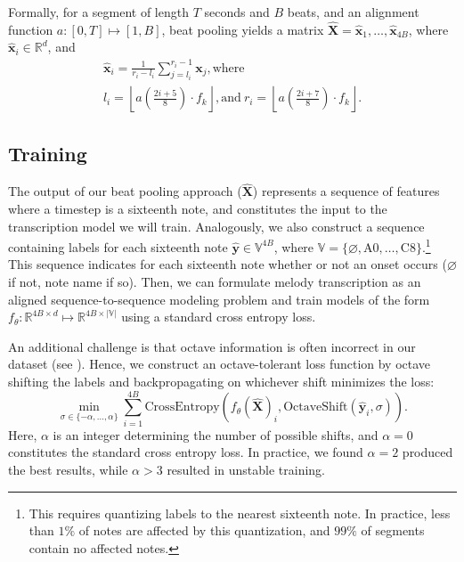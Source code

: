 Formally, for a segment of length $T$ seconds and $B$ beats, and an alignment function $a: [0, T] \mapsto [1, B]$, beat pooling yields a matrix $\hat{\bm{X}} = \hat{\bm{x}}_1, \ldots, \hat{\bm{x}}_{4B}$, where $\hat{\bm{x}}_i \in \mathbb{R}^d$, and
\begin{gather*}
\bm{\hat{x}}_i = \frac{1}{r_i - l_i} \sum_{j = l_i}^{r_i - 1} \bm{x}_j, \text{where} \\
l_i = \left\lfloor a \left(\frac{2i + 5}{8} \right) \cdot f_k \right\rfloor, \text{and}~
r_i = \left\lfloor a \left(\frac{2i + 7}{8} \right) \cdot f_k \right\rfloor.
\end{gather*}

\subsection{Training}

The output of our beat pooling approach ($\hat{\bm{X}}$) represents a sequence of features where a timestep is a sixteenth note, and constitutes the input to the transcription model we will train. 
Analogously, we also construct a sequence containing labels for each sixteenth note $\hat{\bm{y}} \in \mathbb{V}^{4B}$, where 
$\mathbb{V} = \{\varnothing, \text{A0}, \ldots, \text{C8}\}$.\footnote{This requires quantizing labels to the nearest sixteenth note. In practice, less than $1\%$ of notes are affected by this quantization, and $99\%$ of segments contain no affected notes.} 
This sequence indicates for each sixteenth note whether or not an onset occurs ($\varnothing$ if not, note name if so). 
Then, we can formulate melody transcription as an aligned sequence-to-sequence modeling problem and train models of the form $f_{\theta} : \mathbb{R}^{4B \times d} \mapsto \mathbb{R}^{4B \times |\mathbb{V}|}$ using a standard cross entropy loss. 

An additional challenge is that octave information is often incorrect in our dataset (see ). 
Hence, we construct an octave-tolerant loss function by octave shifting the labels and backpropagating on whichever shift minimizes the loss:
\begin{equation*}
\operatorname*{min}_{\sigma \in \{-\alpha, \ldots, \alpha\}} \sum_{i=1}^{4B} \text{CrossEntropy}(f_{\theta}(\bm{\hat{X}})_i, \text{OctaveShift}(\hat{\bm{y}}_i, \sigma)). 
\end{equation*}
Here, $\alpha$ is an integer determining the number of possible shifts, and $\alpha = 0$ constitutes the standard cross entropy loss. 
In practice, we found $\alpha = 2$ produced the best results, while $\alpha > 3$ resulted in unstable training.
